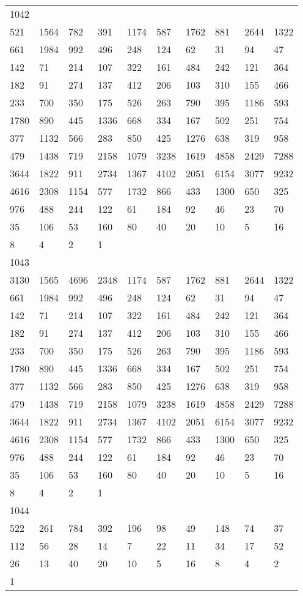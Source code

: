 \begin{longtable}{*{10}{l}}
1042&&&&&&&&&\\
521& 1564& 782& 391& 1174& 587& 1762& 881& 2644& 1322\\
661& 1984& 992& 496& 248& 124& 62& 31& 94& 47\\
142& 71& 214& 107& 322& 161& 484& 242& 121& 364\\
182& 91& 274& 137& 412& 206& 103& 310& 155& 466\\
233& 700& 350& 175& 526& 263& 790& 395& 1186& 593\\
1780& 890& 445& 1336& 668& 334& 167& 502& 251& 754\\
377& 1132& 566& 283& 850& 425& 1276& 638& 319& 958\\
479& 1438& 719& 2158& 1079& 3238& 1619& 4858& 2429& 7288\\
3644& 1822& 911& 2734& 1367& 4102& 2051& 6154& 3077& 9232\\
4616& 2308& 1154& 577& 1732& 866& 433& 1300& 650& 325\\
976& 488& 244& 122& 61& 184& 92& 46& 23& 70\\
35& 106& 53& 160& 80& 40& 20& 10& 5& 16\\
8& 4& 2& 1& \\

1043&&&&&&&&&\\
3130& 1565& 4696& 2348& 1174& 587& 1762& 881& 2644& 1322\\
661& 1984& 992& 496& 248& 124& 62& 31& 94& 47\\
142& 71& 214& 107& 322& 161& 484& 242& 121& 364\\
182& 91& 274& 137& 412& 206& 103& 310& 155& 466\\
233& 700& 350& 175& 526& 263& 790& 395& 1186& 593\\
1780& 890& 445& 1336& 668& 334& 167& 502& 251& 754\\
377& 1132& 566& 283& 850& 425& 1276& 638& 319& 958\\
479& 1438& 719& 2158& 1079& 3238& 1619& 4858& 2429& 7288\\
3644& 1822& 911& 2734& 1367& 4102& 2051& 6154& 3077& 9232\\
4616& 2308& 1154& 577& 1732& 866& 433& 1300& 650& 325\\
976& 488& 244& 122& 61& 184& 92& 46& 23& 70\\
35& 106& 53& 160& 80& 40& 20& 10& 5& 16\\
8& 4& 2& 1& \\

1044&&&&&&&&&\\
522& 261& 784& 392& 196& 98& 49& 148& 74& 37\\
112& 56& 28& 14& 7& 22& 11& 34& 17& 52\\
26& 13& 40& 20& 10& 5& 16& 8& 4& 2\\
1& \\


\end{longtable}
